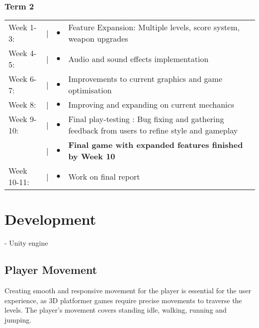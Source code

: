 \documentclass[]{final_report}
\begin{document}
\subsection{Term 2}
\begin{tabular}{@{}p{2cm}@{}>{\raggedright\arraybackslash}p{0.5cm}@{}>{\raggedright\arraybackslash}p{0.5cm}@{}p{12cm}}
Week 1-3: & \textcolor{black}{|} & $\bullet$ & Feature Expansion: Multiple levels, score system, weapon upgrades\\
Week 4-5: & \textcolor{black}{|} & $\bullet$ & Audio and sound effects implementation \\
Week 6-7: & \textcolor{black}{|} & $\bullet$ &  Improvements to current graphics and game optimisation \\
Week 8: & \textcolor{black}{|} & $\bullet$ & Improving and expanding on current mechanics \\
Week 9-10: & \textcolor{black}{|} & $\bullet$ & Final play-testing : Bug fixing and gathering feedback from users to refine style and gameplay\\
& \textcolor{black}{|} & $\bullet$ & \textbf{Final game with expanded features finished by Week 10} \\
Week 10-11: & \textcolor{black}{|} & $\bullet$ & Work on final report \\
\end{tabular}
\chapter{Development}
 - Unity engine
\section{Player Movement}
Creating smooth and responsive movement for the player is essential for the user experience, as 3D platformer games require precise movements to traverse the levels. The player's movement covers standing idle, walking, running and jumping. 
\end{document}
